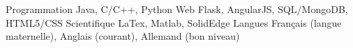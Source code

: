 

\begin{cvskills}

  \cvskill
    {Programmation} %
    {Java, C/C++, Python} %
  \cvskill
    {Web} %
    {Flask, AngularJS, SQL/MongoDB, HTML5/CSS} %
  \cvskill
    {Scientifique} %
    {LaTex, Matlab, SolidEdge} %
  \cvskill
    {Langues} %
    {Français (langue maternelle), Anglais (courant), Allemand (bon niveau)} %

\end{cvskills}
